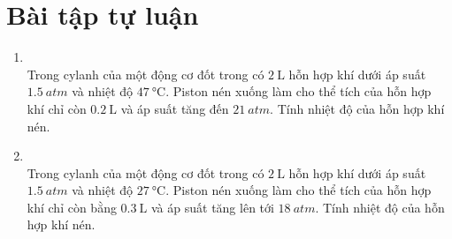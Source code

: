 \section{Bài tập tự luận}
\begin{enumerate}[label=\bfseries Câu \arabic*:, leftmargin=1.7cm]
	\item{}\\
	Trong cylanh của một động cơ đốt trong có $\SI{2}{\liter}$ hỗn hợp khí dưới áp suất $\SI{1.5}{atm}$ và nhiệt độ $\SI{47}{\celsius}$. Piston nén xuống làm cho thể tích của hỗn hợp khí chỉ còn $\SI{0.2}{\liter}$ và áp suất tăng đến $\SI{21}{atm}$. Tính nhiệt độ của hỗn hợp khí nén.

\item{}\\
Trong cylanh của một động cơ đốt trong có $\SI{2}{\liter}$ hỗn hợp khí dưới áp suất $\SI{1.5}{atm}$ và nhiệt độ $\SI{27}{\celsius}$. Piston nén xuống làm cho thể tích của hỗn hợp khí chỉ còn bằng $\SI{0.3}{\liter}$ và áp suất tăng lên tới $\SI{18}{atm}$. Tính nhiệt độ của hỗn hợp khí nén.


\end{enumerate}
